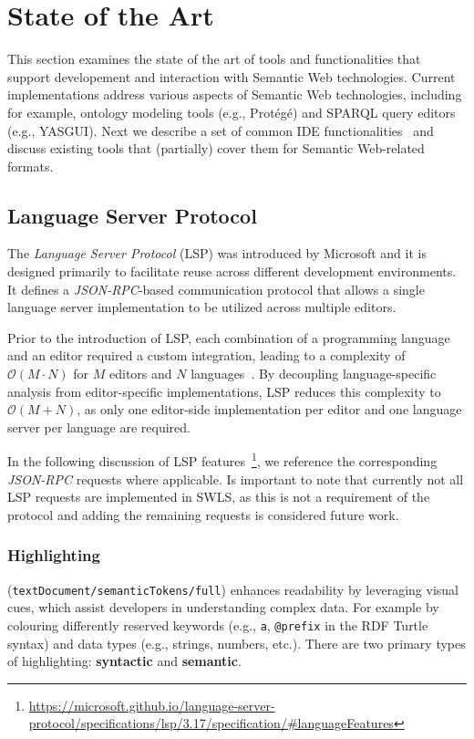 
\section{State of the Art}%
\label{sec:related_work}

This section examines the state of the art of tools and functionalities that support developement and interaction with Semantic Web technologies. 
Current implementations address various aspects of Semantic Web technologies, including for example, ontology modeling tools (e.g., Protégé) and SPARQL query editors (e.g., YASGUI).
Next we describe a set of common IDE functionalities~\cite{HowAreJava} and discuss existing tools that (partially) cover them for Semantic Web-related formats.


\subsection{Language Server Protocol}

The \textit{Language Server Protocol} (LSP) was introduced by Microsoft and it is designed primarily to facilitate reuse across different development environments.
It defines a \textit{JSON-RPC}-based communication protocol that allows a single language server implementation to be utilized across multiple editors.

Prior to the introduction of LSP, each combination of a programming language and an editor required a custom integration, leading to a complexity of \(\mathcal{O}(M \cdot N)\) for \(M\) editors and \(N\) languages~\cite{Kj_r_Rask_2021}.
By decoupling language-specific analysis from editor-specific implementations, LSP reduces this complexity to \(\mathcal{O}(M + N)\), as only one editor-side implementation per editor and one language server per language are required.

In the following discussion of LSP features~\footnote{\url{https://microsoft.github.io/language-server-protocol/specifications/lsp/3.17/specification/\#languageFeatures}}, we reference the corresponding \textit{JSON-RPC} requests where applicable.
Is important to note that currently not all LSP requests are implemented in SWLS, as this is not a requirement of the protocol and adding the remaining requests is considered future work.

\subsubsection{Highlighting} (\texttt{textDocument/semanticTokens/full}) enhances readability by leveraging visual cues, which assist developers in understanding complex data.
For example by colouring differently reserved keywords (e.g., \texttt{a}, \texttt{@prefix} in the RDF Turtle syntax) and data types (e.g., strings, numbers, etc.).  
There are two primary types of highlighting: \textbf{syntactic} and \textbf{semantic}.

